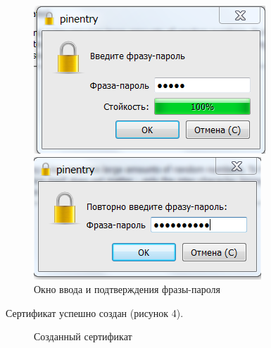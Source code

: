 \documentclass[10pt,a4paper]{report}
\begin{document}
\begin{figure}[h]
\parbox[b]{0.3\linewidth}
	{\centering
     \includegraphics{image/3}}
\hspace*{\fill}
\parbox[b]{0.3\linewidth}
	{\centering
     \includegraphics{image/4}}
 \caption{Окно ввода и подтверждения фразы-пароля}
\end{figure}

Сертификат успешно создан (рисунок  4).
\begin{figure}[h]
	\caption{Созданный сертификат}
\end{figure}
\end{document}
